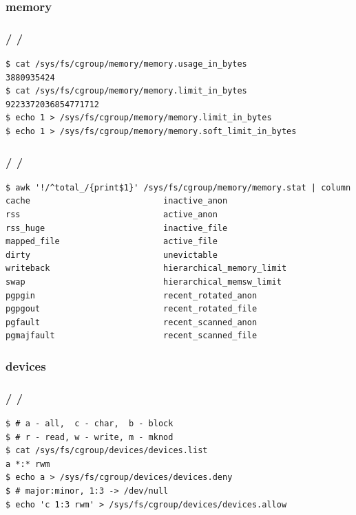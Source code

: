 \documentclass{beamer}
\newcommand{\autotitle}
{\frametitle{
    \secname
    \ifx\insertsubsection\empty
    \else
        /\subsecname
        \ifx\insertsubsubsection\empty\else/\subsubsecname\fi
    \fi}}
\begin{document}
\subsubsection{memory}

\begin{frame}[fragile]
    \autotitle
    \begin{verbatim}
$ cat /sys/fs/cgroup/memory/memory.usage_in_bytes
3880935424
$ cat /sys/fs/cgroup/memory/memory.limit_in_bytes
9223372036854771712
$ echo 1 > /sys/fs/cgroup/memory/memory.limit_in_bytes
$ echo 1 > /sys/fs/cgroup/memory/memory.soft_limit_in_bytes
    \end{verbatim}
\end{frame}

\begin{frame}[fragile]
    \autotitle
    \begin{verbatim}
$ awk '!/^total_/{print$1}' /sys/fs/cgroup/memory/memory.stat | column
cache                           inactive_anon
rss                             active_anon
rss_huge                        inactive_file
mapped_file                     active_file
dirty                           unevictable
writeback                       hierarchical_memory_limit
swap                            hierarchical_memsw_limit
pgpgin                          recent_rotated_anon
pgpgout                         recent_rotated_file
pgfault                         recent_scanned_anon
pgmajfault                      recent_scanned_file
    \end{verbatim}
\end{frame}

\subsubsection{devices}

\begin{frame}[fragile]
    \autotitle
    \begin{verbatim}
$ # a - all,  c - char,  b - block
$ # r - read, w - write, m - mknod
$ cat /sys/fs/cgroup/devices/devices.list
a *:* rwm
$ echo a > /sys/fs/cgroup/devices/devices.deny
$ # major:minor, 1:3 -> /dev/null
$ echo 'c 1:3 rwm' > /sys/fs/cgroup/devices/devices.allow
    \end{verbatim}
\end{frame}
\end{document}
